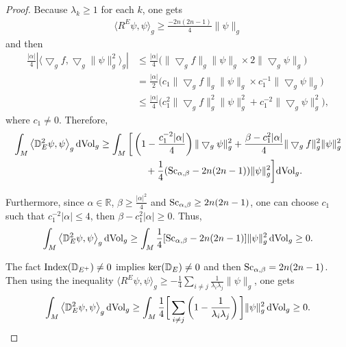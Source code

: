 \documentclass[pdftex]{sigma}
\begin{document}
\begin{proof}
Because $\lambda_k\geq 1$ for each $k$, one gets
\begin{gather*}
 \big\langle R^E\psi, \psi\big\rangle_g \geq \frac{-2n(2n-1)}{4}\|\psi\|_g
 \end{gather*}
 and then
\begin{align*}
\frac{|\alpha|}{4}|\big\langle\bigtriangledown_gf, \bigtriangledown_g \|\psi\|^2_g \big\rangle_g| &\leq \frac{|\alpha|}{4}\big(\|\bigtriangledown_gf\|_g \|\psi\|_g \times 2 \|\bigtriangledown_g \psi\|_g\big)\\
& = \frac{|\alpha|}{2}\big( c_1 \|\bigtriangledown_gf\|_g\|\psi\|_g \times c_1^{-1} \|\bigtriangledown_g\psi\|_g\big) \\
& \leq \frac{|\alpha|}{4} \big(c_1^2 \|\bigtriangledown_gf\|^2_g \|\psi\|^2_g + c_1^{-2} \|\bigtriangledown_g\psi\|^2_g\big),
 \end{align*}
where $c_1 \neq 0$. Therefore,
\begin{gather*}
\int_M \big\langle \mathbb{D}^2_E \psi, \psi \big\rangle_g \,{\rm dVol}_g \geq
 \int_M \bigg[\left(1- \frac{c_1^{-2} |\alpha|}{4}\right)\|\bigtriangledown_g\psi\|^2_g + \frac{\beta - c_1^{2} |\alpha|}{4} \|\bigtriangledown_gf\|^2_g\|\psi\|^2_g \\
\hphantom{\int_M \langle \mathbb{D}^2_E \psi, \psi \rangle_g \,{\rm dVol}_g \geq}{}
 +\frac{1}{4} ({\rm Sc}_{\alpha, \beta}-2n(2n-1)) \|\psi\|^2_g \bigg] {\rm dVol}_g.
\end{gather*}

Furthermore, since $\alpha \in \mathbb{R}$, $\beta \geq \frac{|\alpha|^2}{4}$ and ${\rm Sc}_{\alpha, \beta}\geq 2n(2n-1)$, one can choose $c_1$ such that $c_1^{-2} |\alpha|\leq 4$, then $\beta - c_1^{2} |\alpha|\geq 0$. Thus,
\begin{equation*}
\int_M \big\langle \mathbb{D}^2_E \psi, \psi \big\rangle_g \,{\rm dVol}_g\geq \int_M \frac{1}{4} [{\rm Sc}_{\alpha, \beta}-2n(2n-1)]\|\psi\|^2_g \,{\rm dVol}_g\geq 0.
\end{equation*}

The fact ${\rm Index}(\mathbb{D}_{E^+})\neq 0$ implies ${\rm ker}(\mathbb{D}_E)\neq 0$ and then ${\rm Sc}_{\alpha, \beta}=2n(2n-1)$. Then using the inequality $\big\langle R^E\psi, \psi\big\rangle_g \geq -\frac{1}{4}\sum_{i\neq j}\frac{1}{\lambda_i\lambda_j}\|\psi\|_g$, one gets
\begin{equation*}
\int_M \big\langle \mathbb{D}^2_E \psi, \psi \big\rangle_g \,{\rm dVol}_g\geq \int_M \frac{1}{4} \bigg[\sum_{i\neq j}\left(1-\frac{1}{\lambda_i\lambda_j}\right)\bigg]\|\psi\|^2_g \,{\rm dVol}_g\geq 0.
\end{equation*}


\end{proof}
\end{document}
